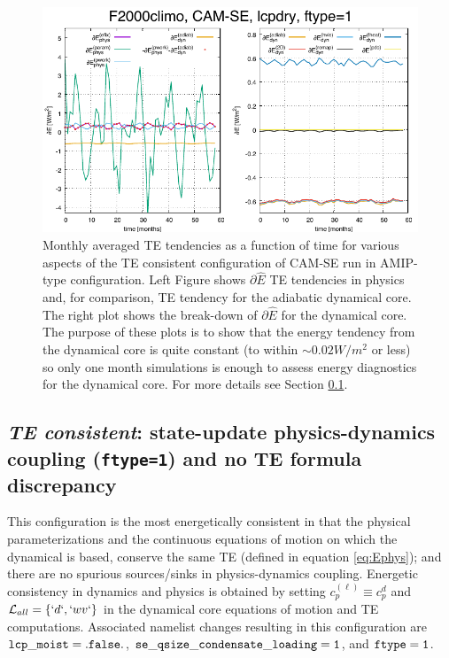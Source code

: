 \documentclass{agujournal}
\newcommand*{\gi}[1]{\widehat{#1}}
\begin{document}
 \begin{figure}[h]
 \centering
 \includegraphics[width=35pc]{figs/dEdt.pdf}
 \caption{Monthly averaged TE tendencies as a function of time for various aspects of the TE consistent configuration of CAM-SE run in AMIP-type configuration. Left Figure shows $\partial \gi{E}$ TE tendencies in physics and, for comparison, TE tendency for the adiabatic dynamical core. The right plot shows the break-down of $\partial \gi{E}$ for the dynamical core. The purpose of these plots is to show that the energy tendency from the dynamical core is quite constant (to within $\sim 0.02W/m^2$ or less) so only one month simulations is enough to assess energy diagnostics for the dynamical core. For more details see Section \ref{sec:consistent}.}
 \label{fig:dEdt(t)}
  \end{figure}




\subsection{{\em{TE consistent}}: state-update physics-dynamics coupling ({\tt{ftype=1}}) and no TE formula discrepancy}
\label{sec:consistent}
This configuration is the most energetically consistent in that the physical parameterizations and the continuous equations of motion on which the dynamical is based, conserve the same TE (defined in equation \eqref{eq:Ephys}); and there are no spurious sources/sinks in physics-dynamics coupling. Energetic consistency in dynamics and physics is obtained by setting $c_p^{(\ell)}\equiv c_p^{d}$ and $\mathcal{L}_{all}=\left\{ `d`,`wv`\right\}$ in the dynamical core equations of motion and TE computations. Associated namelist changes resulting in this configuration are $\tt{lcp\_moist}=.false.$, $\tt{se\_qsize\_condensate\_loading=1}$, and $\tt{ftype=1}$. 
\end{document}
